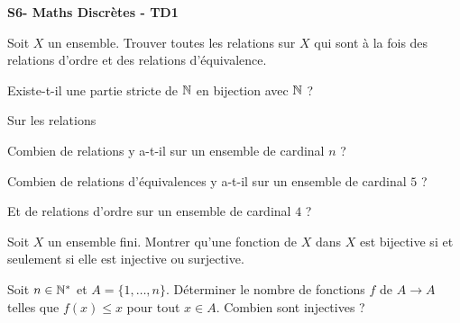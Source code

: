 \documentclass[french]{report}
\begin{document}
\begin{center}
    \huge{\textbf{S6- Maths Discrètes - TD1}}
\end{center}

\begin{exo}
    Soit \(X\) un ensemble. Trouver toutes les relations sur \(X\)
    qui sont à la fois des relations d'ordre et des relations d'équivalence.
\end{exo}

\begin{exo}
    Existe-t-il une partie stricte de \(\mathbb{N}\) en bijection avec \(\mathbb{N}\) ?
\end{exo}

\begin{exo} Sur les relations
    \begin{q}{1}
        Combien de relations y a-t-il sur un ensemble de cardinal \(n\) ?
    \end{q}
    \begin{q}{2}
        Combien de relations d'équivalences y a-t-il sur un ensemble de cardinal \(5\) ?
    \end{q}
    \begin{q}{3}
        Et de relations d'ordre sur un ensemble de cardinal \(4\) ?
    \end{q}
\end{exo}

\begin{exo}
    Soit \(X\) un ensemble fini. Montrer qu'une fonction de \(X\) dans \(X\) est
    bijective si et seulement si elle est injective ou surjective.
\end{exo}

\begin{exo}
    Soit \(n\in\mathbb{N}^*\) et \(A=\{1,\dots,n\}\). Déterminer le nombre de fonctions \(f\)
    de \(A\to A\) telles que \(f(x)\leq x\) pour tout \(x\in A\). Combien sont injectives ?
\end{exo}
\end{document}
